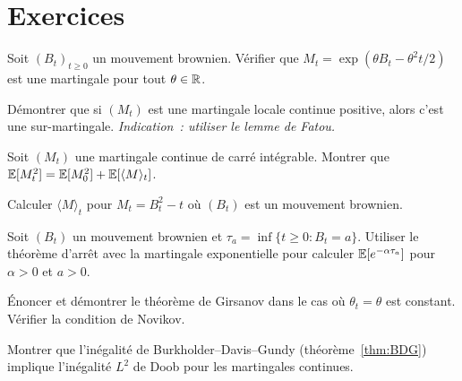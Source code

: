 \section{Exercices}

\begin{exercice}
Soit $(B_t)_{t \geq 0}$ un mouvement brownien. V\'erifier que
$M_t = \exp(\theta B_t - \theta^2 t/2)$ est une martingale pour tout
$\theta \in \mathbb{R}$.
\end{exercice}

\begin{exercice}
D\'emontrer que si $(M_t)$ est une martingale locale continue positive, alors
c'est une sur-martingale. \emph{Indication~: utiliser le lemme de Fatou.}
\end{exercice}

\begin{exercice}
Soit $(M_t)$ une martingale continue de carr\'e int\'egrable. Montrer que
$\mathbb{E}[M_t^2] = \mathbb{E}[M_0^2] + \mathbb{E}[\langle M \rangle_t]$.
\end{exercice}

\begin{exercice}
Calculer $\langle M \rangle_t$ pour $M_t = B_t^2 - t$ o\`u $(B_t)$ est un
mouvement brownien.
\end{exercice}

\begin{exercice}
Soit $(B_t)$ un mouvement brownien et $\tau_a = \inf\{t \geq 0 : B_t = a\}$.
Utiliser le th\'eor\`eme d'arr\^et avec la martingale exponentielle pour calculer
$\mathbb{E}[e^{-\alpha \tau_a}]$ pour $\alpha > 0$ et $a > 0$.
\end{exercice}

\begin{exercice}
\'Enoncer et d\'emontrer le th\'eor\`eme de Girsanov dans le cas o\`u $\theta_t = \theta$
est constant. V\'erifier la condition de Novikov.
\end{exercice}

\begin{exercice}
Montrer que l'in\'egalit\'e de Burkholder--Davis--Gundy (th\'eor\`eme~\ref{thm:BDG})
implique l'in\'egalit\'e $L^2$ de Doob pour les martingales continues.
\end{exercice}
